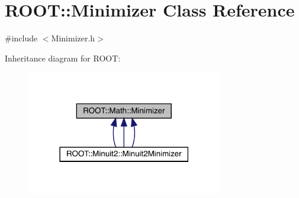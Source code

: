 \hypertarget{classROOT_1_1Math_1_1Minimizer}{}\section{R\+O\+OT\+:\+:Minimizer Class Reference}
\label{classROOT_1_1Math_1_1Minimizer}


{\ttfamily \#include $<$Minimizer.\+h$>$}



Inheritance diagram for R\+O\+OT\+:
\nopagebreak
\begin{figure}[H]
\begin{center}
\leavevmode
\includegraphics[width=242pt]{d5/d2f/classROOT_1_1Math_1_1Minimizer__inherit__graph}
\end{center}
\end{figure}
